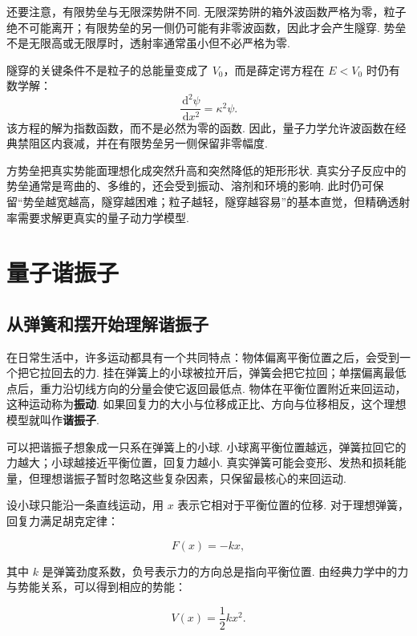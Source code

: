 \documentclass[UTF8,11pt,a4paper,openany]{ctexbook}
\newcommand{\dd}{\,\mathrm d}\newcommand{\Ham}{\hat H}\newcommand{\tr}{\operatorname{Tr}}
\newcommand{\term}[1]{\textbf{#1}}
\begin{document}
还要注意，有限势垒与无限深势阱不同. 无限深势阱的箱外波函数严格为零，粒子绝不可能离开；有限势垒的另一侧仍可能有非零波函数，因此才会产生隧穿. 势垒不是无限高或无限厚时，透射率通常虽小但不必严格为零. 

\begin{derivationbox}
隧穿的关键条件不是粒子的总能量变成了 $V_0$，而是薛定谔方程在 $E<V_0$ 时仍有数学解：
\[
\frac{\dd^2\psi}{\dd x^2}=\kappa^2\psi.
\]
该方程的解为指数函数，而不是必然为零的函数. 因此，量子力学允许波函数在经典禁阻区内衰减，并在有限势垒另一侧保留非零幅度. 
\end{derivationbox}

\begin{limitbox}
方势垒把真实势能面理想化成突然升高和突然降低的矩形形状. 真实分子反应中的势垒通常是弯曲的、多维的，还会受到振动、溶剂和环境的影响. 此时仍可保留“势垒越宽越高，隧穿越困难；粒子越轻，隧穿越容易”的基本直觉，但精确透射率需要求解更真实的量子动力学模型. 
\end{limitbox}
\chapter{量子谐振子}

\section{从弹簧和摆开始理解谐振子}

在日常生活中，许多运动都具有一个共同特点：物体偏离平衡位置之后，会受到一个把它拉回去的力. 挂在弹簧上的小球被拉开后，弹簧会把它拉回；单摆偏离最低点后，重力沿切线方向的分量会使它返回最低点. 物体在平衡位置附近来回运动，这种运动称为\term{振动}. 如果回复力的大小与位移成正比、方向与位移相反，这个理想模型就叫作\term{谐振子}. 

\begin{analogybox}
可以把谐振子想象成一只系在弹簧上的小球. 小球离平衡位置越远，弹簧拉回它的力越大；小球越接近平衡位置，回复力越小. 真实弹簧可能会变形、发热和损耗能量，但理想谐振子暂时忽略这些复杂因素，只保留最核心的来回运动. 
\end{analogybox}

设小球只能沿一条直线运动，用 $x$ 表示它相对于平衡位置的位移. 对于理想弹簧，回复力满足胡克定律：

\[
F(x)=-kx,
\]

其中 $k$ 是弹簧劲度系数，负号表示力的方向总是指向平衡位置. 由经典力学中的力与势能关系，可以得到相应的势能：

\[
V(x)=\frac12 kx^2.
\]
\end{document}
